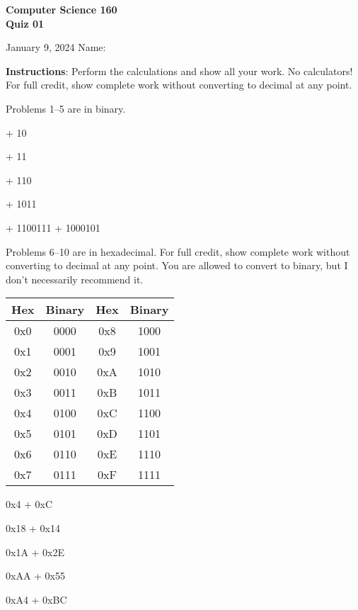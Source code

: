 \documentclass[12pt]{exam}
\begin{document}
\addpoints

\noindent
\textbf{{\large Computer Science 160 \\ Quiz 01}}

\noindent
January 9, 2024  \hfill Name: \underline{\hspace{3in}}

\noindent \textbf{Instructions}: Perform the calculations and show
all your work. No calculators! For full credit, show complete work
without converting to decimal at any point.

Problems 1--5 are in binary.
\begin{questions}

     + 10


     + 11


     + 110


     + 1011


     + 1100111 + 1000101


    \newpage

    Problems 6--10 are in hexadecimal. For full credit, show complete
    work without converting to decimal at any point. You are allowed
    to convert to binary, but I don't necessarily recommend it.

    \begin{tabular}{cccc}
    \toprule
    Hex & Binary & Hex & Binary\\
    \midrule
    0x0 & 0000 & 0x8 & 1000 \\
    0x1 & 0001 & 0x9 & 1001 \\
    0x2 & 0010 & 0xA & 1010 \\
    0x3 & 0011 & 0xB & 1011 \\
    0x4 & 0100 & 0xC & 1100 \\
    0x5 & 0101 & 0xD & 1101 \\
    0x6 & 0110 & 0xE & 1110 \\
    0x7 & 0111 & 0xF & 1111 \\
    \bottomrule
    \end{tabular}

    \question[2] 0x4 + 0xC


    \question[2] 0x18 + 0x14


    \question[2] 0x1A + 0x2E


    \question[2] 0xAA + 0x55


    \question[2] 0xA4 + 0xBC


\end{questions}
\end{document}
